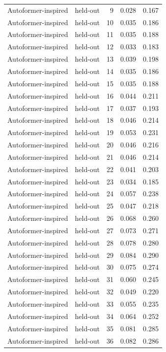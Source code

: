 \begin{tabular}{llrrr}
Autoformer-inspired & held-out & 9 & 0.028 & 0.167 \\
Autoformer-inspired & held-out & 10 & 0.035 & 0.186 \\
Autoformer-inspired & held-out & 11 & 0.035 & 0.188 \\
Autoformer-inspired & held-out & 12 & 0.033 & 0.183 \\
Autoformer-inspired & held-out & 13 & 0.039 & 0.198 \\
Autoformer-inspired & held-out & 14 & 0.035 & 0.186 \\
Autoformer-inspired & held-out & 15 & 0.035 & 0.188 \\
Autoformer-inspired & held-out & 16 & 0.044 & 0.211 \\
Autoformer-inspired & held-out & 17 & 0.037 & 0.193 \\
Autoformer-inspired & held-out & 18 & 0.046 & 0.214 \\
Autoformer-inspired & held-out & 19 & 0.053 & 0.231 \\
Autoformer-inspired & held-out & 20 & 0.046 & 0.216 \\
Autoformer-inspired & held-out & 21 & 0.046 & 0.214 \\
Autoformer-inspired & held-out & 22 & 0.041 & 0.203 \\
Autoformer-inspired & held-out & 23 & 0.034 & 0.185 \\
Autoformer-inspired & held-out & 24 & 0.057 & 0.238 \\
Autoformer-inspired & held-out & 25 & 0.047 & 0.218 \\
Autoformer-inspired & held-out & 26 & 0.068 & 0.260 \\
Autoformer-inspired & held-out & 27 & 0.073 & 0.271 \\
Autoformer-inspired & held-out & 28 & 0.078 & 0.280 \\
Autoformer-inspired & held-out & 29 & 0.084 & 0.290 \\
Autoformer-inspired & held-out & 30 & 0.075 & 0.274 \\
Autoformer-inspired & held-out & 31 & 0.060 & 0.245 \\
Autoformer-inspired & held-out & 32 & 0.049 & 0.220 \\
Autoformer-inspired & held-out & 33 & 0.055 & 0.235 \\
Autoformer-inspired & held-out & 34 & 0.064 & 0.252 \\
Autoformer-inspired & held-out & 35 & 0.081 & 0.285 \\
Autoformer-inspired & held-out & 36 & 0.082 & 0.286 \\

\end{tabular}
